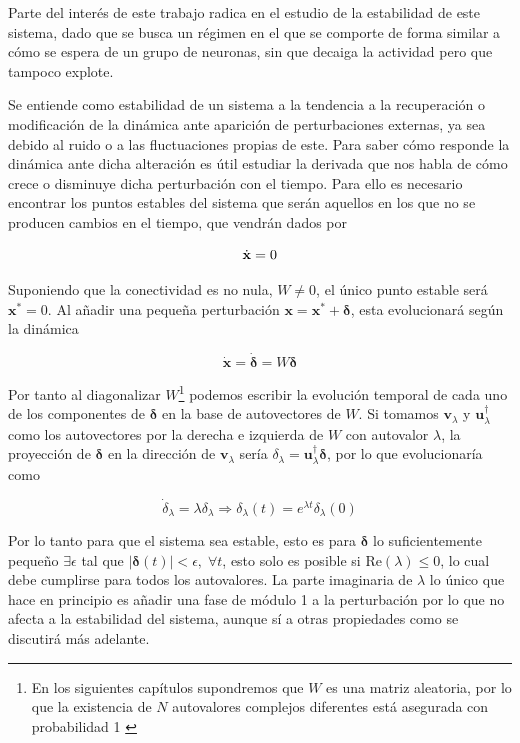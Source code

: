 \documentclass[11pt,a4paper,twoside,pdf]{article}
\numberwithin{equation}{section}
\newcommand{\re}{\text{Re}}
\begin{document}
Parte del interés de este trabajo radica en el estudio de la estabilidad de este sistema, dado que se busca un régimen en el que se comporte de forma similar a cómo se espera de un grupo de neuronas, sin que decaiga la actividad pero que tampoco explote. 

Se entiende como estabilidad de un sistema a la tendencia a la recuperación o modificación de la dinámica ante aparición de perturbaciones externas, ya sea debido al ruido o a las fluctuaciones propias de este. Para saber cómo responde la dinámica ante dicha alteración es útil estudiar la derivada que nos habla de cómo crece o disminuye dicha perturbación con el tiempo. Para ello es necesario encontrar los puntos estables del sistema que serán aquellos en los que no se producen cambios en el tiempo, que vendrán dados por

\begin{equation}
  \dot{\mathbf{x}} = 0\\
\end{equation}

Suponiendo que la conectividad es no nula, \(W\neq 0\), el único punto estable será \(\mathbf{x}^* = 0\). Al añadir una pequeña perturbación \(\mathbf{x} = \mathbf{x}^* + \bm{\delta}\), esta evolucionará según la dinámica

\begin{equation}
  \dot{\mathbf{x}} = \dot{\bm{\delta}} = W\bm{\delta}
\end{equation}

Por tanto al diagonalizar \(W\)\footnote{En los siguientes capítulos supondremos que \(W\) es una matriz aleatoria, por lo que la existencia de \(N\) autovalores complejos diferentes está asegurada con probabilidad 1 \parencite{mehta1991}} podemos escribir la evolución temporal de cada uno de los componentes de \(\bm{\delta}\) en la base de autovectores de \(W\). Si tomamos \(\mathbf{v}_\lambda\) y \(\mathbf{u}^\dagger_\lambda\) como los autovectores por la derecha e izquierda de \(W\) con autovalor \(\lambda\), la proyección de \(\bm{\delta}\) en la dirección de \(\mathbf{v}_\lambda\) sería \(\delta_\lambda = \mathbf{u}_\lambda^\dagger \bm{\delta}\), por lo que evolucionaría como

\begin{equation}
  \dot{\delta}_\lambda = \lambda \delta_\lambda \Rightarrow \delta_\lambda(t) = e^{\lambda t}\delta_\lambda (0)
\end{equation}

Por lo tanto para que el sistema sea estable, esto es para \(\bm{\delta}\) lo suficientemente pequeño \(\exists \epsilon \) tal que \( |\bm{\delta}(t)| < \epsilon, \; \forall t\), esto solo es posible si \(\re{(\lambda)} \le 0\), lo cual debe cumplirse para todos los autovalores. La parte imaginaria de \(\lambda\) lo único que hace en principio es añadir una fase de módulo 1 a la perturbación por lo que no afecta a la estabilidad del sistema, aunque sí a otras propiedades como se discutirá más adelante.
\end{document}
